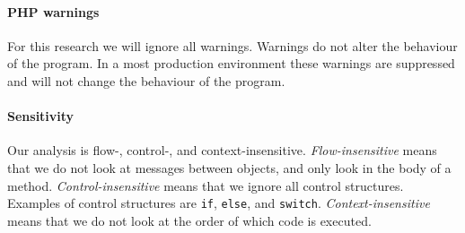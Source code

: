 \documentclass[../main.tex]{subfiles}
\begin{document}
    \paragraph{PHP warnings}
    For this research we will ignore all warnings.
    Warnings do not alter the behaviour of the program.
    In a most production environment these warnings are suppressed and will not change the behaviour of the program.
    
    \paragraph{Sensitivity}
    Our analysis is flow-, control-, and context-insensitive.
    \textit{Flow-insensitive} means that we do not look at messages between objects, and only look in the body of a method.
    \textit{Control-insensitive} means that we ignore all control structures. 
    Examples of control structures are \texttt{if}, \texttt{else}, and \texttt{switch}.
    \textit{Context-insensitive} means that we do not look at the order of which code is executed.
     
    
\end{document}
